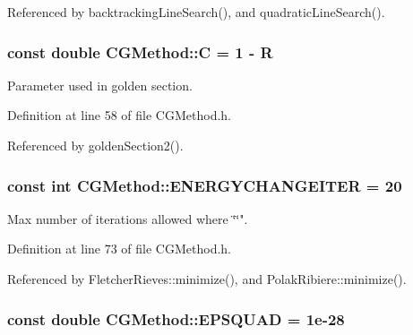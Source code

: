 Referenced by backtracking\+Line\+Search(), and quadratic\+Line\+Search().

\hypertarget{classCGMethod_af8587ca1c0394c244ce84fe8a6ad29ff}{
\subsubsection[{C}]{\setlength{\rightskip}{0pt plus 5cm}const double C\+G\+Method\+::\+C = 1 -\/ {\bf R}\hspace{0.3cm}{\ttfamily [protected]}}}\label{classCGMethod_af8587ca1c0394c244ce84fe8a6ad29ff}


Parameter used in golden section. 



Definition at line 58 of file C\+G\+Method.\+h.



Referenced by golden\+Section2().

\hypertarget{classCGMethod_aaee1e11813855cc66c360f7cb3d9665a}{
\subsubsection[{E\+N\+E\+R\+G\+Y\+C\+H\+A\+N\+G\+E\+I\+T\+E\+R}]{\setlength{\rightskip}{0pt plus 5cm}const int C\+G\+Method\+::\+E\+N\+E\+R\+G\+Y\+C\+H\+A\+N\+G\+E\+I\+T\+E\+R = 20\hspace{0.3cm}{\ttfamily [protected]}}}\label{classCGMethod_aaee1e11813855cc66c360f7cb3d9665a}


Max number of iterations allowed where \char`\"{}\char`\"{}". 



Definition at line 73 of file C\+G\+Method.\+h.



Referenced by Fletcher\+Rieves\+::minimize(), and Polak\+Ribiere\+::minimize().

\hypertarget{classCGMethod_adb2a688fe52a8729d703d81e52b9fdb3}{
\subsubsection[{E\+P\+S\+Q\+U\+A\+D}]{\setlength{\rightskip}{0pt plus 5cm}const double C\+G\+Method\+::\+E\+P\+S\+Q\+U\+A\+D = 1e-\/28\hspace{0.3cm}{\ttfamily [protected]}}}\label{classCGMethod_adb2a688fe52a8729d703d81e52b9fdb3}


